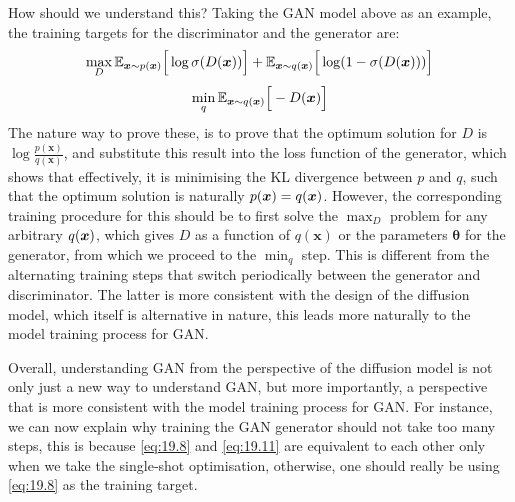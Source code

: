 How should we understand this? Taking the GAN model above as an example, the training targets for the discriminator and the generator are:
\begin{equation}
    \label{eq:19.13}
    \max_{D}\mathbb{E}_{\bm{x}\sim p(\bm{x})}\Big[ \log \sigma(D(\bm{x}))\Big]+\mathbb{E}_{\bm{x}\sim q(\bm{x})}\Big[ \log(1-\sigma(D(\bm{x})))\Big]
\end{equation}
\begin{equation}
    \label{eq:19.14}
    \min_{q}\mathbb{E}_{\bm{x}\sim q(\bm{x})}\Big[-D(\bm{x})\Big]
\end{equation}
The nature way to prove these, is to prove that the optimum solution for $D$ is $\log\frac{p(\bm{x})}{q(\bm{x})}$, and substitute this result into the loss function of the generator, which shows that effectively, it is minimising the KL divergence between $p$ and $q$, such that the optimum solution is naturally $p(\bm{x})=q(\bm{x})$. However, the corresponding training procedure for this should be to first solve the $\max_{D}$ problem for any arbitrary $q(\bm{x})$, which gives $D$ as a function of $q(\bm{x})$ or the parameters $\bm{\theta}$ for the generator, from which we proceed to the $\min_q$ step. This is different from the alternating training steps that switch periodically between the generator and discriminator. The latter is more consistent with the design of the diffusion model, which itself is alternative in nature, this leads more naturally to the model training process for GAN.

Overall, understanding GAN from the perspective of the diffusion model is not only just a new way to understand GAN, but more importantly, a perspective that is more consistent with the model training process for GAN. For instance, we can now explain why training the GAN generator should not take too many steps, this is because \cref{eq:19.8} and \cref{eq:19.11} are equivalent to each other only when we take the single-shot optimisation, otherwise, one should really be using \cref{eq:19.8} as the training target.
